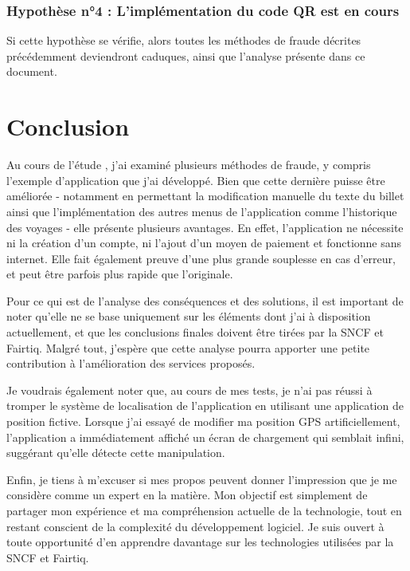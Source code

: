 \documentclass[a4paper]{article}
\begin{document}
\subsubsection*{Hypothèse n°4 : L'implémentation du code QR est en cours}
Si cette hypothèse se vérifie, alors toutes les méthodes de fraude décrites précédemment deviendront caduques,
ainsi que l'analyse présente dans ce document.


\clearpage

\section{Conclusion}


Au cours de l'\og étude \fg, j'ai examiné plusieurs méthodes de fraude, y compris l'exemple d'application que j'ai développé.
Bien que cette dernière puisse être améliorée - notamment en permettant la modification manuelle du texte du billet
ainsi que l'implémentation des autres menus de l'application comme l'historique des voyages - elle présente plusieurs avantages.
En effet, l'application ne nécessite ni la création d'un compte, ni l'ajout d'un moyen de paiement et fonctionne sans internet. Elle fait
également preuve d'une plus grande souplesse en cas d'erreur, et peut être parfois plus rapide que l'originale.

Pour ce qui est de l'analyse des conséquences et des solutions, il est important de noter qu'elle ne se base uniquement
sur les éléments dont j'ai à disposition actuellement, et que les conclusions finales doivent être tirées par la SNCF et Fairtiq.
Malgré tout, j'espère que cette analyse pourra apporter une petite contribution à l'amélioration des services proposés.

Je voudrais également noter que, au cours de mes tests, je n'ai pas réussi à tromper le système de localisation de
l'application en utilisant une application de position fictive. Lorsque j'ai essayé de modifier ma position GPS
artificiellement, l'application a immédiatement affiché un écran de chargement qui semblait infini,
suggérant qu'elle détecte cette manipulation.

Enfin, je tiens à m'excuser si mes propos peuvent donner l'impression que je me considère
comme un expert en la matière. Mon objectif est simplement de partager mon expérience et
ma compréhension actuelle de la technologie, tout en restant conscient de la complexité
du développement logiciel. Je suis ouvert à toute opportunité d'en apprendre davantage sur
les technologies utilisées par la SNCF et Fairtiq.
\end{document}
